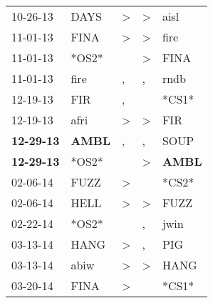 \begin{supertabular}{p{0.07\textwidth}p{0.06\textwidth}p{0.02\textwidth}p{0.02\textwidth}p{0.06\textwidth}}
          10-26-13\textsuperscript{} &           DAYS\textsuperscript{} &     \textgreater &     \textgreater &           aisl\textsuperscript{} \\
          11-01-13\textsuperscript{} &           FINA\textsuperscript{} &     \textgreater &     \textgreater &           fire\textsuperscript{} \\
          11-01-13\textsuperscript{} &                            *OS2* &                  &     \textgreater &           FINA\textsuperscript{} \\
          11-01-13\textsuperscript{} &           fire\textsuperscript{} &                , &                , &           rndb\textsuperscript{} \\
          12-19-13\textsuperscript{} &            FIR\textsuperscript{} &                , &                  &                            *CS1* \\
          12-19-13\textsuperscript{} &           afri\textsuperscript{} &     \textgreater &     \textgreater &            FIR\textsuperscript{} \\
 \textbf{12-29-13\textsuperscript{}} &  \textbf{AMBL\textsuperscript{}} &                , &                , &           SOUP\textsuperscript{} \\
 \textbf{12-29-13\textsuperscript{}} &                            *OS2* &                  &     \textgreater &  \textbf{AMBL\textsuperscript{}} \\
          02-06-14\textsuperscript{} &           FUZZ\textsuperscript{} &     \textgreater &                  &                            *CS2* \\
          02-06-14\textsuperscript{} &           HELL\textsuperscript{} &     \textgreater &     \textgreater &           FUZZ\textsuperscript{} \\
          02-22-14\textsuperscript{} &                            *OS2* &                  &                , &           jwin\textsuperscript{} \\
          03-13-14\textsuperscript{} &           HANG\textsuperscript{} &     \textgreater &                , &            PIG\textsuperscript{} \\
          03-13-14\textsuperscript{} &           abiw\textsuperscript{} &     \textgreater &     \textgreater &           HANG\textsuperscript{} \\
          03-20-14\textsuperscript{} &           FINA\textsuperscript{} &     \textgreater &                  &                            *CS1* \\

\end{supertabular}
